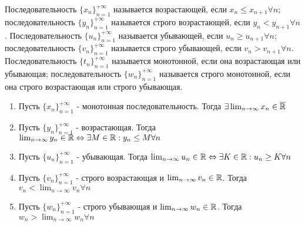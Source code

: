 \documentclass[main]{subfiles}
\begin{document}
\begin{definition}
    Последовательность $\{x_n\}_{n=1}^{+\infty}$ называется возрастающей, если
    $x_n \leq x_{n+1} \forall n$; последовательность $\{y_n\}_{n=1}^{+\infty}$
    называется строго возрастающей, если $y_n < y_{n+1} \forall n$.
    Последовательность $\{u_n\}_{n=1}^{+\infty}$ называется убывающей, если
    $u_n \geq u_{n+1} \forall n$; последовательность $\{v_n\}_{n=1}^{+\infty}$
    называется строго убывающей, если $v_n > v_{n+1} \forall n$.
    Последовательность $\{t_n\}_{n=1}^{+\infty}$ называется монотонной, если
    она возрастающая или убывающая; последовательность $\{w_n\}_{n=1}^{+\infty}$
    называется строго монотонной, если она строго возрастающая или строго 
    убывающая.
\end{definition}

\begin{theorem}
    \begin{enumerate}
        \item Пусть $\{x_n\}_{n=1}^{+\infty}$ - монотонная последовательность.
        Тогда $\exists \lim_{n\to\infty}x_n \in \overline{\mathbb{R}}$
        \item Пусть $\{y_n\}_{n=1}^{+\infty}$ - возрастающая.
        Тогда $\lim_{n\to\infty}y_n \in \mathbb{R} \Leftrightarrow \exists M \in \mathbb{R} :
        y_n \leq M \forall n$
        \item Пусть $\{u_n\}_{n=1}^{+\infty}$ - убывающая.
        Тогда $\lim_{n\to\infty}u_n \in \mathbb{R} \Leftrightarrow \exists K \in \mathbb{R} :
        u_n \geq K \forall n$
        \item Пусть $\{v_n\}_{n=1}^{+\infty}$ - строго возрастающая и 
        $\lim_{n\to\infty}v_n \in \mathbb{R}$. Тогда $v_n < \lim_{n\to\infty}v_n
        \forall n$
        \item Пусть $\{w_n\}_{n=1}^{+\infty}$ - строго убывающая и 
        $\lim_{n\to\infty}w_n \in \mathbb{R}$. Тогда $w_n > \lim_{n\to\infty}w_n
        \forall n$
    \end{enumerate}
\end{theorem}
\end{document}
